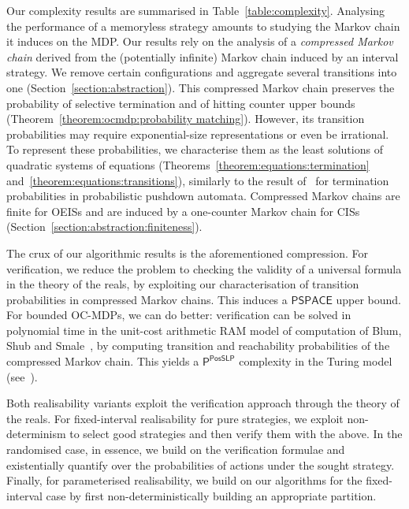 \documentclass[a4paper,UKenglish,cleveref,autoref,thm-restate,colorlinks]{lipics-v2021}
\newcommand{\ptime}{\textsf{P}}
\newcommand{\pspace}{\textsf{PSPACE}}
\newcommand{\posSLP}{\textsf{PosSLP}}
\begin{document}
Our complexity results are summarised in Table~\ref{table:complexity}.
Analysing the performance of a memoryless strategy amounts to studying the Markov chain it induces on the MDP.
Our results rely on the analysis of a \textit{compressed Markov chain} derived from the (potentially infinite) Markov chain induced by an interval strategy.
We remove certain configurations and aggregate several transitions into one (Section~\ref{section:abstraction}).
This compressed Markov chain preserves the probability of selective termination and of hitting counter upper bounds (Theorem~\ref{theorem:ocmdp:probability matching}).
However, its transition probabilities may require exponential-size representations or even be irrational.
To represent these probabilities, we characterise them as the least solutions of quadratic systems of equations (Theorems~\ref{theorem:equations:termination} and~\ref{theorem:equations:transitions}), similarly to the result of~\cite{DBLP:journals/lmcs/KuceraEM06} for termination probabilities in probabilistic pushdown automata.
Compressed Markov chains are finite for OEISs and are induced by a one-counter Markov chain for CISs (Section~\ref{section:abstraction:finiteness}).

The crux of our algorithmic results is the aforementioned compression. For verification, we reduce the problem to checking the validity of a universal formula in the theory of the reals, by exploiting our characterisation of transition probabilities in compressed Markov chains. This induces a $\pspace$ upper bound. For bounded OC-MDPs, we can do better: verification can be solved in polynomial time in the unit-cost arithmetic RAM model of computation of Blum, Shub and Smale~\cite{BSS1989}, by computing transition and reachability probabilities of the compressed Markov chain. This yields a $\ptime^\posSLP$ complexity in the Turing model (see~\cite{DBLP:journals/siamcomp/AllenderBKM09}).

Both realisability variants exploit the verification approach through the theory of the reals. For fixed-interval realisability for pure strategies, we exploit non-determinism to select good strategies and then verify them with the above. In the randomised case, in essence, we build on the verification formulae and existentially quantify over the probabilities of actions under the sought strategy. Finally, for parameterised realisability, we build on our algorithms for the fixed-interval case by first non-deterministically building an appropriate partition.
\end{document}
